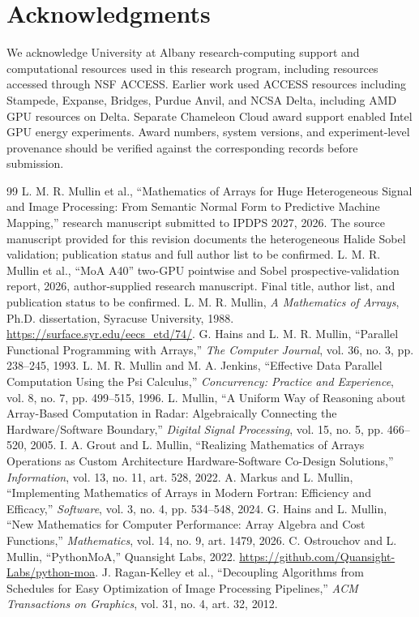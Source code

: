 \documentclass[11pt]{article}
\begin{document}
\section*{Acknowledgments}
We acknowledge University at Albany research-computing support and computational resources used in this research program, including resources accessed through NSF ACCESS. Earlier work used ACCESS resources including Stampede, Expanse, Bridges, Purdue Anvil, and NCSA Delta, including AMD GPU resources on Delta. Separate Chameleon Cloud award support enabled Intel GPU energy experiments. Award numbers, system versions, and experiment-level provenance should be verified against the corresponding records before submission.
\begin{thebibliography}{99}
 L. M. R. Mullin et al., ``Mathematics of Arrays for Huge Heterogeneous Signal and Image Processing: From Semantic Normal Form to Predictive Machine Mapping,'' research manuscript submitted to IPDPS 2027, 2026. The source manuscript provided for this revision documents the heterogeneous Halide Sobel validation; publication status and full author list to be confirmed.
 L. M. R. Mullin et al., ``MoA A40'' two-GPU pointwise and Sobel prospective-validation report, 2026, author-supplied research manuscript. Final title, author list, and publication status to be confirmed.
 L. M. R. Mullin, \emph{A Mathematics of Arrays}, Ph.D. dissertation, Syracuse University, 1988. \url{https://surface.syr.edu/eecs_etd/74/}.
 G. Hains and L. M. R. Mullin, ``Parallel Functional Programming with Arrays,'' \emph{The Computer Journal}, vol. 36, no. 3, pp. 238--245, 1993.
 L. M. R. Mullin and M. A. Jenkins, ``Effective Data Parallel Computation Using the Psi Calculus,'' \emph{Concurrency: Practice and Experience}, vol. 8, no. 7, pp. 499--515, 1996.
 L. Mullin, ``A Uniform Way of Reasoning about Array-Based Computation in Radar: Algebraically Connecting the Hardware/Software Boundary,'' \emph{Digital Signal Processing}, vol. 15, no. 5, pp. 466--520, 2005.
 I. A. Grout and L. Mullin, ``Realizing Mathematics of Arrays Operations as Custom Architecture Hardware-Software Co-Design Solutions,'' \emph{Information}, vol. 13, no. 11, art. 528, 2022.
 A. Markus and L. Mullin, ``Implementing Mathematics of Arrays in Modern Fortran: Efficiency and Efficacy,'' \emph{Software}, vol. 3, no. 4, pp. 534--548, 2024.
 G. Hains and L. Mullin, ``New Mathematics for Computer Performance: Array Algebra and Cost Functions,'' \emph{Mathematics}, vol. 14, no. 9, art. 1479, 2026.
 C. Ostrouchov and L. Mullin, ``PythonMoA,'' Quansight Labs, 2022. \url{https://github.com/Quansight-Labs/python-moa}.
 J. Ragan-Kelley et al., ``Decoupling Algorithms from Schedules for Easy Optimization of Image Processing Pipelines,'' \emph{ACM Transactions on Graphics}, vol. 31, no. 4, art. 32, 2012.


\end{thebibliography}
\end{document}
